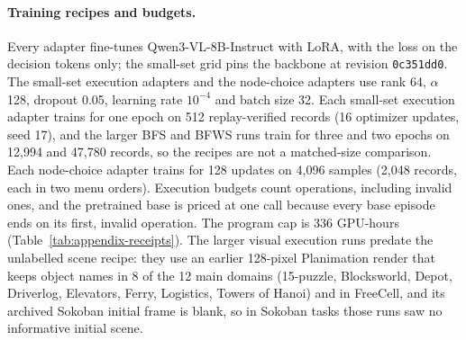 \paragraph{Training recipes and budgets.}
Every adapter fine-tunes Qwen3-VL-8B-Instruct with LoRA, with the loss on the decision tokens only; the small-set grid pins the backbone at revision \texttt{0c351dd0}. The small-set execution adapters and the node-choice adapters use rank 64, $\alpha$ 128, dropout 0.05, learning rate $10^{-4}$ and batch size 32. Each small-set execution adapter trains for one epoch on 512 replay-verified records (16 optimizer updates, seed 17), and the larger BFS and BFWS runs train for three and two epochs on 12,994 and 47,780 records, so the recipes are not a matched-size comparison. Each node-choice adapter trains for 128 updates on 4,096 samples (2,048 records, each in two menu orders). Execution budgets count operations, including invalid ones, and the pretrained base is priced at one call because every base episode ends on its first, invalid operation. The program cap is 336 GPU-hours (Table~\ref{tab:appendix-receipts}). The larger visual execution runs predate the unlabelled scene recipe: they use an earlier 128-pixel Planimation render that keeps object names in 8 of the 12 main domains (15-puzzle, Blocksworld, Depot, Driverlog, Elevators, Ferry, Logistics, Towers of Hanoi) and in FreeCell, and its archived Sokoban initial frame is blank, so in Sokoban tasks those runs saw no informative initial scene.

